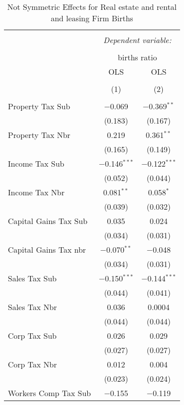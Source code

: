 
\begin{table}[!htbp] \centering 
  \caption{Not Symmetric Effects for  Real estate and rental and leasing Firm Births} 
  \label{} 
\begin{tabular}{@{\extracolsep{5pt}}lcc} 
\\[-1.8ex]\hline 
\hline \\[-1.8ex] 
 & \multicolumn{2}{c}{\textit{Dependent variable:}} \\ 
\cline{2-3} 
\\[-1.8ex] & \multicolumn{2}{c}{births ratio} \\ 
 & OLS & OLS \\ 
\\[-1.8ex] & (1) & (2)\\ 
\hline \\[-1.8ex] 
 Property Tax Sub & $-$0.069 & $-$0.369$^{**}$ \\ 
  & (0.183) & (0.167) \\ 
  Property Tax Nbr & 0.219 & 0.361$^{**}$ \\ 
  & (0.165) & (0.149) \\ 
  Income Tax Sub & $-$0.146$^{***}$ & $-$0.122$^{***}$ \\ 
  & (0.052) & (0.044) \\ 
  Income Tax Nbr & 0.081$^{**}$ & 0.058$^{*}$ \\ 
  & (0.039) & (0.032) \\ 
  Capital Gains Tax Sub & 0.035 & 0.024 \\ 
  & (0.034) & (0.031) \\ 
  Capital Gains Tax nbr & $-$0.070$^{**}$ & $-$0.048 \\ 
  & (0.034) & (0.031) \\ 
  Sales Tax Sub & $-$0.150$^{***}$ & $-$0.144$^{***}$ \\ 
  & (0.044) & (0.041) \\ 
  Sales Tax Nbr & 0.036 & 0.0004 \\ 
  & (0.044) & (0.044) \\ 
  Corp Tax Sub & 0.026 & 0.029 \\ 
  & (0.027) & (0.027) \\ 
  Corp Tax Nbr & 0.012 & 0.004 \\ 
  & (0.023) & (0.024) \\ 
  Workers Comp Tax Sub & $-$0.155 & $-$0.119 \\ 

\end{tabular}
\end{table}
